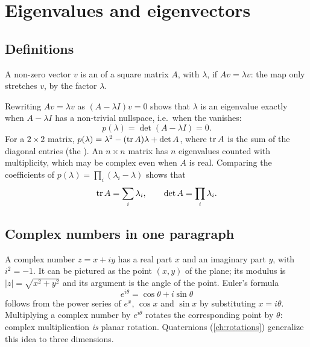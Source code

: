 \section{Eigenvalues and eigenvectors}

\subsection{Definitions}

\begin{definition}
A non-zero vector $v$ is an  of a square matrix $A$, with  $\lambda$, if
$Av = \lambda v$: the map only stretches $v$, by the factor $\lambda$.
\end{definition}

Rewriting $Av = \lambda v$ as $(A - \lambda I)v = 0$ shows that $\lambda$ is an eigenvalue exactly when $A - \lambda I$ has a
non-trivial nullspace, i.e.\ when the  vanishes:
\begin{equation}
  p(\lambda) = \det(A - \lambda I) = 0 .
\end{equation}
For a $2\times2$ matrix, $p(\lambda) = \lambda^2 - (\operatorname{tr} A)\lambda + \det A$, where $\operatorname{tr} A$ is the sum of the diagonal entries (the
). An $n\times n$ matrix has $n$ eigenvalues counted with multiplicity, which may be complex even when $A$ is
real. Comparing the coefficients of $p(\lambda) = \prod_i(\lambda_i - \lambda)$ shows that
\begin{equation}
  \operatorname{tr} A = \sum_i\lambda_i, \qquad \det A = \prod_i\lambda_i .
  \label{eq:trace-det-eig}
\end{equation}

\subsection{Complex numbers in one paragraph}

A complex number $z = x + iy$ has a real part $x$ and an imaginary part $y$, with $i^2 = -1$. It can be pictured as the
point $(x, y)$ of the plane; its modulus is $|z| = \sqrt{x^2 + y^2}$ and its argument is the angle of the point. Euler's
formula
\begin{equation}
  e^{i\theta} = \cos\theta + i\sin\theta
\end{equation}
follows from the power series of $e^x$, $\cos x$ and $\sin x$ by substituting $x = i\theta$. Multiplying a complex number by
$e^{i\theta}$ rotates the corresponding point by $\theta$: complex multiplication \emph{is} planar rotation. Quaternions
(\cref{ch:rotations}) generalize this idea to three dimensions.

